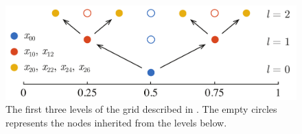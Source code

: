 \begin{figure}[t]
  \centering
  \vspace{-1.0em}
  \includegraphics[width=0.9\columnwidth]{include/assets/figures/grid.pdf}
  \vspace{-0.5em}
  \caption{
    The first three levels of the grid described in . The empty
    circles represents the nodes inherited from the levels below.
  }
\end{figure}
